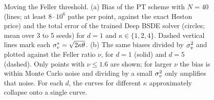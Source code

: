 {\begin{figure}[t]
\caption{Moving the Feller threshold. (a) Bias of the PT scheme with $N=40$ (lines; at least $8\cdot10^6$ paths per point, against the exact Heston price) and the total error of the trained Deep BSDE solver (circles; mean over 3 to 5 seeds) for $d=1$ and $\kappa\in\{1,2,4\}$. Dashed vertical lines mark each $\sigma_v^*=\sqrt{2\kappa\theta}$. (b) The same biases divided by $\sigma_v^2$ and plotted against the Feller ratio $\nu$, for $d=1$ (solid) and $d=5$ (dashed). Only points with $\nu\le1.6$ are shown; for larger $\nu$ the bias is within Monte Carlo noise and dividing by a small $\sigma_v^2$ only amplifies that noise. For each $d$, the curves for different $\kappa$ approximately collapse onto a single curve.}
\label{fig:feller}
\end{figure}}


